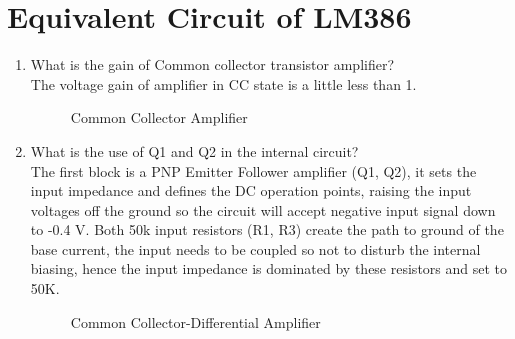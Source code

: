 \documentclass[journal,12pt,twocolumn]{IEEEtran}
\renewcommand\thesection{\arabic{section}}
\begin{document}
\section{Equivalent Circuit of LM386}
\begin{enumerate}[label=\thesection.\arabic*,ref=\thesection.\theenumi]

\begin{figure}[!ht]
\centering	
\resizebox{\columnwidth}{!}{}
\caption{LM386 Amplifier}
\label{fig:orig}	
\end{figure}


\section{ Common Collector(Emitter Follower) Buffer}


\item What is the gain of Common collector transistor amplifier?\\
\solution 
The voltage gain of amplifier in CC state is a little less than 1.
\begin{figure}[!ht]
\centering	
\resizebox{\columnwidth}{!}{}
\caption{Common Collector Amplifier}
\label{fig:cc}	
\end{figure}

\item What is the use of Q1 and Q2 in the internal circuit?\\
\solution
The first block is a PNP Emitter Follower amplifier (Q1, Q2), it sets the input impedance and defines the DC operation points, raising the input voltages off the ground so the circuit will accept negative input signal down to -0.4 V. Both 50k input resistors (R1, R3) create the path to ground of the base current, the input needs to be coupled so not to disturb the internal biasing, hence the input impedance is dominated by these resistors and set to 50K.
%
\begin{figure}[!ht]
\centering	
\resizebox{\columnwidth}{!}{}
\caption{Common Collector-Differential Amplifier}
\label{fig:ccdiff}	
\end{figure}
\end{enumerate}
\end{document}
